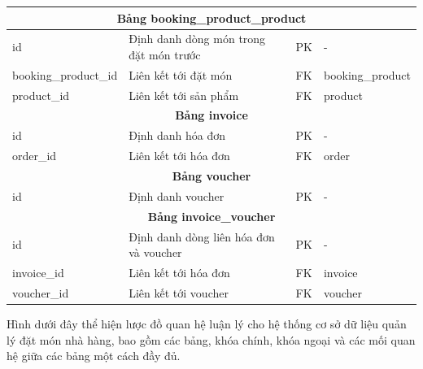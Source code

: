 \begin{longtable}{|l|p{6cm}|l|l|}
	\multicolumn{4}{|c|}{\textbf{Bảng booking\_product\_product}}                                                           \\
	\hline
	id                      & Định danh dòng món trong đặt món trước         & PK                 & -                       \\
	booking\_product\_id    & Liên kết tới đặt món                           & FK                 & booking\_product        \\
	product\_id             & Liên kết tới sản phẩm                          & FK                 & product                 \\
	\hline

	\multicolumn{4}{|c|}{\textbf{Bảng invoice}}                                                                             \\
	\hline
	id                      & Định danh hóa đơn                              & PK                 & -                       \\
	order\_id               & Liên kết tới hóa đơn                           & FK                 & order                   \\
	\hline

	\multicolumn{4}{|c|}{\textbf{Bảng voucher}}                                                                             \\
	\hline
	id                      & Định danh voucher                              & PK                 & -                       \\
	\hline

	\multicolumn{4}{|c|}{\textbf{Bảng invoice\_voucher}}                                                                    \\
	\hline
	id                      & Định danh dòng liên hóa đơn và voucher         & PK                 & -                       \\
	invoice\_id             & Liên kết tới hóa đơn                           & FK                 & invoice                 \\
	voucher\_id             & Liên kết tới voucher                           & FK                 & voucher                 \\
	\hline
\end{longtable}

Hình dưới đây thể hiện lược đồ quan hệ luận lý cho hệ thống cơ sở dữ liệu quản lý đặt món nhà hàng, bao gồm các bảng, khóa chính, khóa ngoại và các mối quan hệ giữa các bảng một cách đầy đủ.

